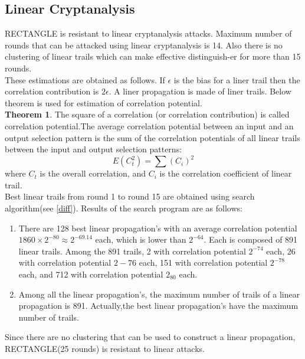 \documentclass[final]{transcrypto}
\begin{document}
\subsection{Linear Cryptanalysis}
RECTANGLE is resistant to linear cryptanalysis attacks. Maximum number of rounds that can be attacked using linear cryptanalysis is 14. Also there is no clustering of linear trails which can make effective distinguish-er for more than 15 rounds.\\
These estimations are obtained as follows. If $\epsilon$ is the bias for a liner trail then the correlation contribution is $2\epsilon$. A liner propagation is made of liner trails. Below theorem is used for estimation of correlation potential.\\
\textbf{Theorem 1}. The square of a correlation (or correlation contribution) is called correlation potential.The average correlation potential between an input and an output selection pattern is the sum of the correlation potentials of all linear trails between the input and output selection patterns:
$$E(C_t^2) = \sum (C_i)^2$$ 
where $C_t$ is the overall correlation, and $C_i$ is the correlation coefficient of linear trail.\\
Best linear trails from round 1 to round 15 are obtained using search algorithm(see \ref{diff}). Results of the search program are as follows:\cite{rectangle}\cite{imprAttack}
\begin{enumerate}
    \item There are 128 best linear propagation's with an average correlation potential $1860\times 2^{-80}\approx 2^{-69.14}$ each, which is lower than $2^{-64}$. Each is composed of 891 linear trails. Among the 891 trails, 2 with correlation potential $2^{-74}$ each, 26 with correlation potential $2-{76}$ each, 151 with correlation potential $2^{-78}$ each, and 712 with correlation potential $2_80$ each.
    \item Among all the linear propagation's, the maximum number of trails of a linear propagation is 891. Actually,the best linear propagation's have the maximum number of trails.
\end{enumerate}
Since there are no clustering that can be used to construct a linear propagation, RECTANGLE(25 rounds) is resistant to linear attacks. 
\end{document}
